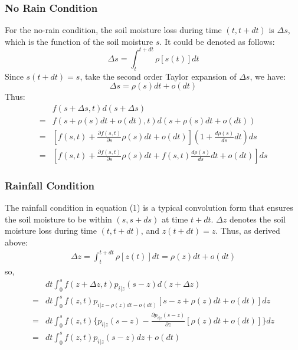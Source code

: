 \documentclass{beamer}
\begin{document}
\begin{frame}
\frametitle{No Rain Condition}
For the no-rain condition, the soil moisture loss during time $(t,t+dt)$ is $\Delta s$, which is the function of the soil moisture $s$. It could be denoted as follows:
\begin{equation}
\Delta s=\int_t^{t+dt} \rho[s(t)]dt
\end{equation}
Since $s(t+dt)= s$, take the second order Taylor expansion of $\Delta s$, we have:
\begin{equation}
\Delta s=\rho(s)dt+o(dt)
\end{equation}
Thus:
\begin{equation}
\begin{split}
&f(s+\Delta s,t)d(s+\Delta s)\\=&f(s+\rho(s)dt+o(dt),t)d(s+\rho(s)dt+o(dt))
\\=&[f(s,t)+\frac{\partial{f(s,t)}}{\partial s}\rho(s)dt+o(dt)](1+\frac{d\rho(s)}{ds}dt)ds
\\=&[f(s,t)+\frac{\partial{f(s,t)}}{\partial s}\rho(s)dt+f(s,t)\frac{d\rho(s)}{ds}dt+o(dt)]ds
\end{split}
\end{equation}
\end{frame}
\begin{frame}
\frametitle{Rainfall Condition}
The rainfall condition in equation (1) is a typical convolution form that ensures the soil moisture to be within $(s,s+ds)$ at time $t+dt$. $\Delta z$ denotes the soil moisture loss during time $(t,t+dt)$, and 
$z(t+dt)=z$.  Thus, as derived above:
\begin{equation}
\begin{split}
\Delta z=\int_t^{t+dt} \rho[z(t)]dt=\rho(z)dt+o(dt)
\end{split}
\end{equation} 
so,
\begin{equation}
\begin{split}
 &dt\int_{0}^{s} f(z+\Delta z,t)p_{i|z}(s-z)d(z+\Delta z)\\=&dt\int_{0}^{s} f(z,t)p_{i|z-\rho(z)dt-o(dt)}[s-z+\rho(z)dt+o(dt)]dz\\=&dt\int_{0}^{s} f(z,t)\lbrace p_{i|z}(s-z)-\frac{\partial p_{i|z}(s-z)}{\partial z}[\rho(z)dt+o(dt)]\rbrace dz\\=&dt\int_{0}^{s} f(z,t)p_{i|z}(s-z)dz+o(dt)
 \end{split}
\end{equation}
\end{frame}
\end{document}
